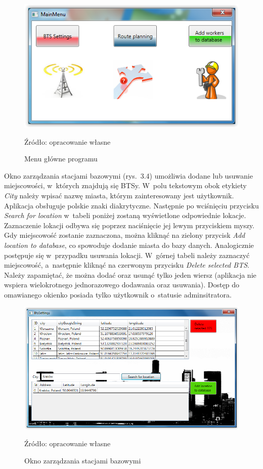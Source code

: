 \documentclass[12pt,a4paper]{report}
\begin{document}
\begin{figure}[!bht]
\centering
\includegraphics[scale=0.5]{Pictures/MainMenu.png}
\label{fig: MainMenu}
\caption{Menu główne programu}{Źródło: opracowanie własne}
\end{figure}

Okno zarządzania stacjami bazowymi (rys.~3.4) umożliwia dodane lub usuwanie miejscowości, w~których znajdują się BTSy. W~polu tekstowym obok etykiety \textit{City} należy wpisać nazwę miasta, którym zainteresowany jest użytkownik. Aplikacja obsługuje polskie znaki diakrytyczne. Następnie po wciśnięciu przycisku \textit{Search for location} w~tabeli poniżej zostaną wyświetlone odpowiednie lokacje. Zaznaczenie lokacji odbywa się poprzez naciśnięcie jej lewym przyciskiem myszy. Gdy miejscowość zostanie zaznaczona, można kliknąć na zielony przycisk \textit{Add location to database}, co spowoduje dodanie miasta do bazy danych. Analogicznie postępuje się w~przypadku usuwania lokacji. W~górnej tabeli należy zaznaczyć miejscowość, a~następnie kliknąć na czerwonym przycisku \textit{Delete selected BTS}. Należy zapamiętać, że można dodać oraz usunąć tylko jeden wiersz (aplikacja nie wspiera wielokrotnego jednorazowego dodawania oraz usuwania). Dostęp do omawianego okienko posiada tylko użytkownik o~statusie adminsitratora.

\begin{figure}[!bht]
\centering
\includegraphics[scale=0.5]{Pictures/BtsSettings.png}
\label{fig: BtsSettings}
\caption{Okno zarządzania stacjami bazowymi}{Źródło: opracowanie własne}
\end{figure}
\end{document}
